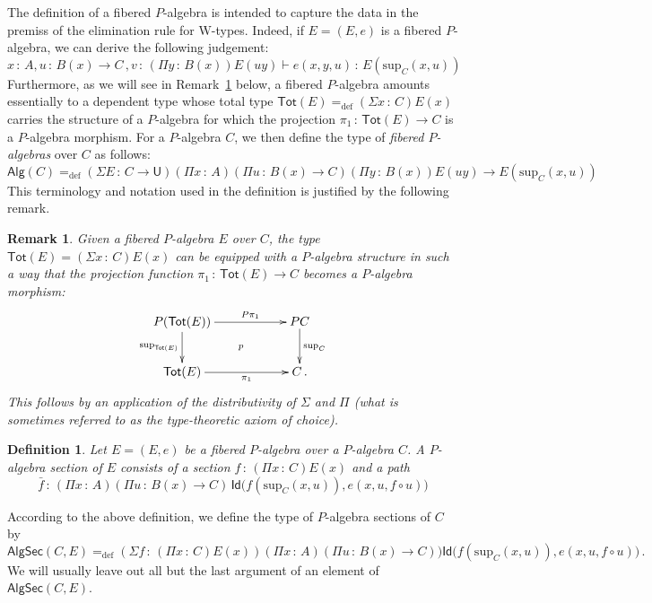 \documentclass[10pt,a4paper,oneside,reqno]{amsart}
\theoremstyle{mythm}
\theoremstyle{mydef}
\newtheorem{definition}[theorem]{Definition}
\theoremstyle{myrmk}
\newtheorem{remark}[theorem]{Remark}
\newcommand{\ie}{\text{i.e.\ }}
\newcommand{\defeq}{=_{\mathrm{def}}}
\newcommand{\co}{\,{:}\,}
\newcommand{\Id}{\mathsf{Id}}
\newcommand{\W}{\mathrm{W}}
\newcommand{\U}{\mathsf{U}}
\newcommand{\Tot}{\mathsf{Tot}}
\newcommand{\Palg}{\mathsf{Alg}}
\renewcommand{\sup}{\mathrm{sup}}
\newcommand{\PalgSec}{\mathsf{AlgSec}}
\begin{document}
The definition of a fibered $P$-algebra is intended to capture the data in the premiss of the elimination 
rule for $\W$-types. Indeed, if $E = (E, e)$ is a fibered $P$-algebra, we can derive the following judgement:
\[
x \co A, u \co B(x) \to C \, , v \co (\Pi y \co B(x)) E(u y) \vdash e(x,y,u) \co E(\sup_C(x,u))
\]
Furthermore, as we will see in Remark~\ref{thm:fibalg} below, a fibered $P$-algebra amounts essentially to a dependent type whose total
type $\mathsf{Tot}(E) \defeq (\Sigma x \co C) E(x)$ carries the structure of a $P$-algebra for which the projection $\pi_1 \co \mathsf{Tot}(E) 
\to C$ is a $P$-algebra morphism.  For a $P$-algebra $C$, we then define the type of \emph{fibered $P$-algebras} over $C$ as follows:
\[
\Palg(C) \defeq (\Sigma E \co C \to \U) (\Pi x \co A) (\Pi u \co B(x) \to C) 
 (\Pi y \co B(x))  E(u y)  \to E(\sup_C(x,u))
 \]
This terminology and notation used in the definition is justified by the following remark.

\begin{remark}\label{thm:fibalg}
Given a fibered $P$-algebra $E$ over $C$, the type $\Tot(E) =  (\Sigma x \co  C) E(x)$ can be equipped with 
a $P$-algebra structure in such a way that  the projection function $\pi_1 \co \Tot(E) \to C$ becomes a $P$-algebra morphism:
\[
\xymatrix@C=2cm{
P(\Tot(E)) \ar[r]^-{P\pi_1} \ar[d]_-{\sup_{\Tot(E)}} \ar@{}[rd]|{p} & PC \ar[d]^{\sup_C} \\ 
\Tot(E)  \ar[r]_-{\pi_1} & C \, .}
 \]
 This follows by an application of the distributivity of $\Sigma$ and $\Pi$ (\ie what is sometimes
referred to as the type-theoretic axiom of choice). 
\end{remark}

\begin{definition} \label{def:fibalgsection} Let $E = (E, e)$ be a fibered $P$-algebra over a $P$-algebra $C$.  
A \emph{$P$-algebra section} of $E$ consists of a section $f \co (\Pi x \co C) E(x)$ and a path
\[ 
\bar{f} \co (\Pi x \co A) (\Pi u \co B(x) \to C) \, \Id \big( f(\sup_C(x,u)), e(x, u, f \circ u) \big)
\]
\end{definition} 

According to the above definition, we define the type of $P$-algebra sections of $C$ by
\[ 
\PalgSec(C,E)  \defeq (\Sigma f  \co (\Pi x \co C) E(x)) (\Pi x \co A) (\Pi u \co  B(x) \to C) ) 
\Id\big(   f(\sup_C(x,u)) ,  e(x,u,f  \circ u) \big) \, .
\]
We will usually leave out all but the last argument of an element of $\PalgSec(C,E)$. 
\end{document}
